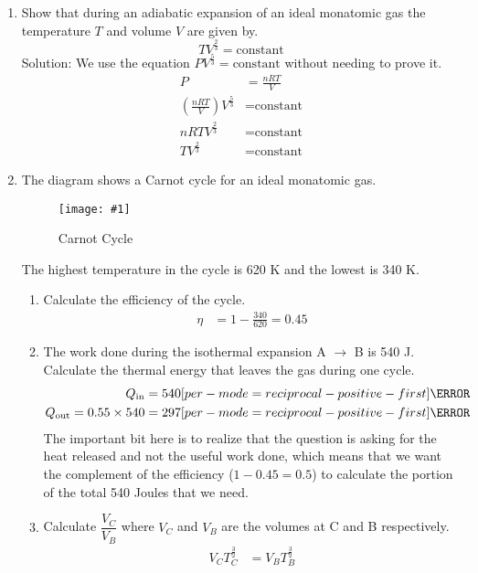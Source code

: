 \documentclass[a4paper,12pt]{article}
\let\oldsi\si
\renewcommand{\si}[1]{\oldsi[per-mode=reciprocal-positive-first]{#1}}
\newcommand{\img}[4]{\begin{center}
  \begin{figure}[H]
    \centering
    \texttt{[image: \#1]}
    \caption{#3}
    \label{fig:#4}
  \end{figure}
\end{center}}
\begin{document}
\begin{enumerate}[label=(\alph*)]
  \item Show that during an adiabatic expansion of an ideal monatomic gas the temperature $T$ and volume $V$ are given by.
        $$TV^{\frac{2}{3}} = \text{constant}$$
        Solution: We use the equation $PV^{\frac{5}{3}} = \text{constant}$ without needing to prove it.
        \begin{align*}
          P                              & = \frac{nRT}{V}   \\
          (\frac{nRT}{V})V^{\frac{5}{3}} & = \text{constant} \\
          nRTV^{\frac{2}{3}}             & = \text{constant} \\
          TV^{\frac{2}{3}}               & = \text{constant}
        \end{align*}
  \item The diagram shows a Carnot cycle for an ideal monatomic gas.
        \img{ex/4.png}{0.3}{Carnot Cycle}{ex4}
        The highest temperature in the cycle is 620 K and the lowest is 340 K.
        \begin{enumerate}[label=(\roman*)]
          \item Calculate the efficiency of the cycle.
                \begin{align*}
                  \eta & = 1 - \frac{340}{620} = 0.45
                \end{align*}
          \item The work done during the isothermal expansion A $\to$ B is 540 J. Calculate the
                thermal energy that leaves the gas during one cycle.
                \begin{align*}
                  Q_\text{in}                    & = 540\si{\joule} \\
                  Q_\text{out} = 0.55 \times 540 & = 297\si{\joule}
                \end{align*}
                The important bit here is to realize that the question is asking for the heat released and not the useful work done, which means that we want the complement of the efficiency ($1 - 0.45 = 0.5$) to calculate the portion of the total 540 Joules that we need.
          \item Calculate $\dfrac{V_C}{V_B}$ where $V_C$ and $V_B$ are the volumes at C and B respectively.
                \begin{align*}
                  V_CT_C^\frac{3}{2}                                         & = V_BT_B^\frac{3}{2}                             \\

\end{align*}
\end{enumerate}
\end{enumerate}
\end{document}
